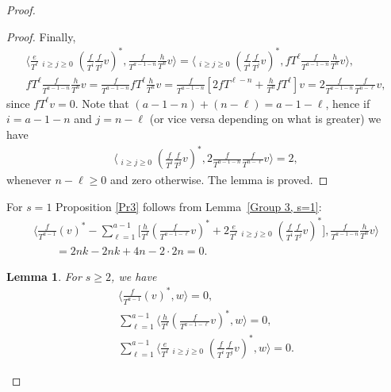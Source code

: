 \documentclass[11pt]{article}
\numberwithin{equation}{section}
\newtheorem{lem}[thm]{Lemma}
\begin{document}
\begin{proof}
\begin{proof}
Finally,
\begin{gather*}
\bigg\langle \frac{e}{T^{\ell}} \mathop{\sum_{i+j=a-1-\ell}}_{i\geq j\geq 0} \left(\frac{f}{T^i}\frac{f}{T^j}v\right)^*, \frac{f}{T^{a-1-n}}\frac{h}{T^n} v \bigg\rangle = \bigg\langle \mathop{\sum_{i+j=a-1-\ell}}_{i\geq j\geq 0} \left(\frac{f}{T^i}\frac{f}{T^j}v\right)^*, fT^{\ell} \frac{f}{T^{a-1-n}}\frac{h}{T^n} v \bigg\rangle, \\
fT^{\ell} \frac{f}{T^{a-1-n}}\frac{h}{T^n} v = \frac{f}{T^{a-1-n}} fT^{\ell} \frac{h}{T^n} v = \frac{f}{T^{a-1-n}} \left[ 2fT^{\ell-n} + \frac{h}{T^n} fT^{\ell} \right] v = 2 \frac{f}{T^{a-1-n}} \frac{f}{T^{n-\ell}} v,
\end{gather*}
since $ fT^{\ell} v = 0$. Note that $(a-1-n)+(n-\ell)=a-1-\ell$, hence if $i = a-1-n$ and $j = n-\ell$ (or vice versa depending on what is greater) we have
\begin{gather*}
\bigg\langle \mathop{\sum_{i+j=a-1-\ell}}_{i\geq j\geq 0} \left(\frac{f}{T^i}\frac{f}{T^j}v\right)^*, 2 \frac{f}{T^{a-1-n}} \frac{f}{T^{n-\ell}} v \bigg\rangle = 2,
\end{gather*}
whenever $n-\ell \geq 0$ and zero otherwise. The lemma is proved.
\end{proof}

For $s=1$ Proposition \ref{Pr3} follows from Lemma~\ref{Group 3, s=1}:
\begin{gather*}
\bigg\langle \frac{f}{T^{a-1}} (v)^* - \sum_{\ell=1}^{a-1} \bigg[\frac{h}{T^{\ell}}\left(\frac{f}{T^{a-1-\ell}}v\right)^* + 2\frac{e}{T^{\ell}} \mathop{\sum_{i+j=a-1-\ell}}_{i\geq j\geq 0} \left(\frac{f}{T^i}\frac{f}{T^j}v\right)^*\bigg], \frac{f}{T^{a-1-n}}\frac{h}{T^n} v \bigg\rangle \\
\qquad = 2nk - 2nk + 4n - 2 \cdot 2n = 0.
\end{gather*}

\begin{lem}\label{lem G1s}
For $s \geq 2$, we have
\begin{gather}
\bigg\langle \frac{f}{T^{a-1}}(v) ^*, w \bigg\rangle =0, \label{G1sg1} \\
\sum_{\ell=1}^{a-1} \bigg\langle \frac{h}{T^{\ell}} \left(\frac{f}{T^{a-1-\ell}}v\right)^*, w \bigg\rangle =0, \label{G1sg2} \\
\sum_{\ell=1}^{a-1} \bigg\langle \frac{e}{T^{\ell}} \mathop{\sum_{i+j=a-1-\ell}}_{i\geq j\geq 0} \left(\frac{f}{T^i}\frac{f}{T^j}v\right)^*, w \bigg\rangle = 0. \label{G1sg3}
\end{gather}
\end{lem}


\end{proof}
\end{document}
